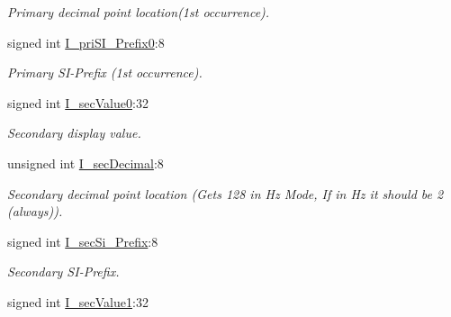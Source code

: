 \begin{DoxyCompactItemize}
\begin{DoxyCompactList}\small\item\em Primary decimal point location(1st occurrence). \item\end{DoxyCompactList}\item 
\hypertarget{structFluke_1_1Fluke189_1_1cmdr__QD0__t_ad3c88ba7e8144cb07c3cb54940f1bcd9}{
signed int \hyperlink{structFluke_1_1Fluke189_1_1cmdr__QD0__t_ad3c88ba7e8144cb07c3cb54940f1bcd9}{I\_\-priSI\_\-Prefix0}:8}
\label{structFluke_1_1Fluke189_1_1cmdr__QD0__t_ad3c88ba7e8144cb07c3cb54940f1bcd9}

\begin{DoxyCompactList}\small\item\em Primary SI-\/Prefix (1st occurrence). \item\end{DoxyCompactList}\item 
\hypertarget{structFluke_1_1Fluke189_1_1cmdr__QD0__t_a94e8cd3d213ebf0ef3cf1a3a2170aea9}{
signed int \hyperlink{structFluke_1_1Fluke189_1_1cmdr__QD0__t_a94e8cd3d213ebf0ef3cf1a3a2170aea9}{I\_\-secValue0}:32}
\label{structFluke_1_1Fluke189_1_1cmdr__QD0__t_a94e8cd3d213ebf0ef3cf1a3a2170aea9}

\begin{DoxyCompactList}\small\item\em Secondary display value. \item\end{DoxyCompactList}\item 
\hypertarget{structFluke_1_1Fluke189_1_1cmdr__QD0__t_a47c07f7ccb922b0081471811993862cb}{
unsigned int \hyperlink{structFluke_1_1Fluke189_1_1cmdr__QD0__t_a47c07f7ccb922b0081471811993862cb}{I\_\-secDecimal}:8}
\label{structFluke_1_1Fluke189_1_1cmdr__QD0__t_a47c07f7ccb922b0081471811993862cb}

\begin{DoxyCompactList}\small\item\em Secondary decimal point location (Gets 128 in Hz Mode, If in Hz it should be 2 (always)). \item\end{DoxyCompactList}\item 
signed int \hyperlink{structFluke_1_1Fluke189_1_1cmdr__QD0__t_a3bc502dcc711f5c308028b588e57e226}{I\_\-secSi\_\-Prefix}:8
\begin{DoxyCompactList}\small\item\em Secondary SI-\/Prefix. \item\end{DoxyCompactList}\item 
\hypertarget{structFluke_1_1Fluke189_1_1cmdr__QD0__t_afdcb84ab9c16b00e53c76233958f111a}{
signed int \hyperlink{structFluke_1_1Fluke189_1_1cmdr__QD0__t_afdcb84ab9c16b00e53c76233958f111a}{I\_\-secValue1}:32}
\label{structFluke_1_1Fluke189_1_1cmdr__QD0__t_afdcb84ab9c16b00e53c76233958f111a}


\end{DoxyCompactItemize}
